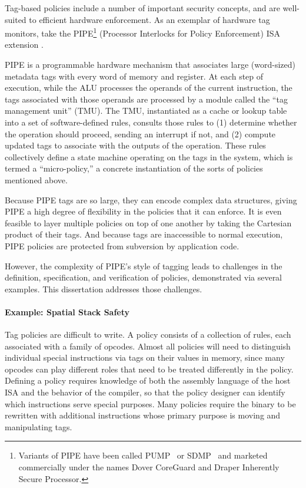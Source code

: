 \documentclass{report}
\begin{document}
Tag-based policies include a number of important security concepts, and are well-suited to
efficient hardware enforcement. As an exemplar of hardware tag monitors, take the 
PIPE\footnote{ Variants of PIPE have
been called PUMP~\cite{Dhawan+15} or SDMP~\cite{RoesslerD18} and marketed commercially
under the names Dover CoreGuard and Draper Inherently Secure Processor.}
(Processor Interlocks for Policy Enforcement) ISA extension \cite{Azevedo+16,Azevedo+15}.

PIPE is a programmable hardware mechanism that associates large (word-sized) metadata tags
with every word of memory and register. At each step of execution, while the ALU processes
the operands of the current instruction, the tags associated with those operands are processed
by a module called the ``tag management unit'' (TMU).
The TMU, instantiated as a cache or lookup table into a set of software-defined rules,
consults those rules to (1) determine whether the operation should
proceed, sending an interrupt if not, and (2) compute updated tags to associate with the
outputs of the operation. These rules collectively define a state machine operating on the
tags in the system, which is termed a ``micro-policy,'' a concrete instantiation of the
sorts of policies mentioned above.

Because PIPE tags are so large, they can encode complex data structures, giving PIPE a high
degree of flexibility in the policies that it can enforce. It is even feasible to layer
multiple policies on top of one another by taking the Cartesian product of their tags.
And because tags are inaccessible to normal execution, PIPE policies are protected from
subversion by application code.

However, the complexity of PIPE's style of tagging leads to challenges in the definition,
specification, and verification of policies, demonstrated via several examples.
This dissertation addresses those challenges.

\paragraph{Example: Spatial Stack Safety}

Tag policies are difficult to write.
A policy consists of a collection of rules, each associated with a family of opcodes.
Almost all policies will need to distinguish
individual special instructions via tags on their values in memory, since many opcodes can
play different roles that need to be
treated differently in the policy. Defining a policy requires knowledge of both the assembly
language of the host ISA and the behavior of the compiler, so that the policy designer can
identify which instructions serve special purposes. Many policies require the binary
to be rewritten with additional instructions whose primary purpose is moving and manipulating
tags.
\end{document}
